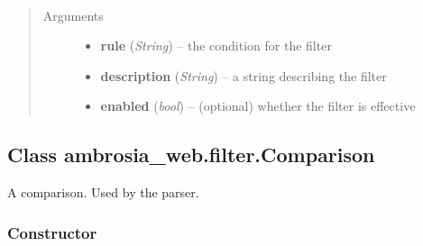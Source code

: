 \documentclass[letterpaper,10pt,english]{sphinxmanual}
\begin{document}
\begin{fulllineitems}
\label{ambrosia_web.filter.BlacklistFilter:ambrosia_web.filter.BlacklistFilter}~\begin{quote}\begin{description}
\item[{Arguments}] \leavevmode\begin{itemize}
\item {} 
\textbf{rule} (\emph{String}) -- the condition for the filter

\item {} 
\textbf{description} (\emph{String}) -- a string describing the filter

\item {} 
\textbf{enabled} (\emph{bool}) -- (optional) whether the filter is effective

\end{itemize}

\end{description}\end{quote}

\end{fulllineitems}



\subsection{Class ambrosia\_web.filter.Comparison}
\label{ambrosia_web.filter.Comparison:class-ambrosia-web-filter-comparison}\label{ambrosia_web.filter.Comparison::doc}
A comparison. Used by the parser.


\subsubsection{Constructor}
\label{ambrosia_web.filter.Comparison:constructor}
\end{document}
